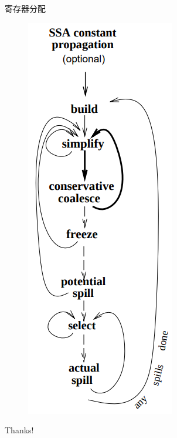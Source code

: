 \documentclass{beamer}
\begin{document}
\begin{frame}{寄存器分配}
\begin{minipage}{0.2\linewidth}
\begin{figure}[htpb]
    \includegraphics[width=1.0\linewidth]{pic/reg.png}
  \end{figure}
\end{minipage}
\end{frame}

\begin{frame}
    \begin{center}
        {\Huge\calligra Thanks!}
    \end{center}
\end{frame}
\end{document}
